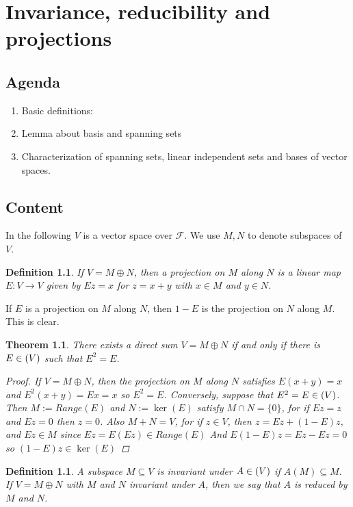 \documentclass[10pt,twoside,openany,final]{memoir}
\theoremstyle{break}
\newtheorem{theorem}[section]{Theorem}
\newtheorem{definition}[section]{Definition}
\theoremstyle{Break}
\let\End\relax
\DeclareMathOperator{\End}{End}
\newcommand{\F}{\mathcal{F}}
\begin{document}
\chapter{Invariance, reducibility and projections}
\section*{Agenda}
\begin{enumerate}
	\item Basic definitions: 
	\item Lemma about basis and spanning sets
	\item Characterization of spanning sets, linear independent sets and bases of vector spaces.
\end{enumerate}
\section*{Content}
In the following $V$ is a vector space over $\F$. We use $M,N$ to denote subspaces of $V$.
\begin{definition}
	If $V=M \oplus N$, then a projection on $M$ along $N$ is a linear map $E \colon V \to V$ given by $Ez=x$ for $z=x+y$ with $x \in M$ and $y \in N$.
\end{definition}
If $E$ is a projection on $M$ along $N$, then $1-E$ is the projection on $N$ along $M$. This is clear.
\begin{theorem}
	There exists a direct sum $V=M \oplus N$ if and only if there is $E \in \End(V)$ such that $E^2=E$.
	\begin{proof}
		If $V= M \oplus N$, then the projection on $M$ along $N$ satisfies $E(x+y)=x$ and $E^2(x+y)=Ex=x$ so $E^2=E$. Conversely, suppose that $E^2=E \in \End(V)$. Then $M:=Range(E)$ and $N:=\ker(E)$ satisfy $M\cap N= \{0\}$, for if $Ez=z$ and $Ez=0$ then $z=0$. Also $M+N=V$, for if $z \in V$, then $z=Ez+(1-E)z$, and $Ez \in M$ since $Ez=E ( Ez) \in Range(E)$ And $E(1-E)z=Ez-Ez=0$ so $(1-E)z \in \ker(E)$
	\end{proof}
\end{theorem}

\begin{definition}
	A subspace $M \subseteq V$ is invariant under $A \in \End(V)$ if $A(M) \subseteq M$. If $V= M \oplus N$ with $M$ and $N$ invariant under $A$, then we say that $A$ is reduced by $M$ and $N$. 
\end{definition}
\end{document}
